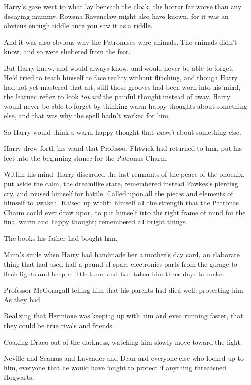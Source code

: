 Harry's gaze went to what lay beneath the cloak, the horror far worse than any
decaying mummy. Rowena Ravenclaw might also have known, for it was an obvious
enough riddle once you saw it as a riddle.

And it was also obvious why the Patronuses were animals. The animals didn't
know, and so were sheltered from the fear.

But Harry knew, and would always know, and would never be able to forget. He'd
tried to teach himself to face reality without flinching, and though Harry had
not yet mastered that art, still those grooves had been worn into his mind, the
learned reflex to look \emph{toward} the painful thought instead of away. Harry
would never be able to forget by thinking warm happy thoughts about something
else, and that was why the spell hadn't worked for him.

So Harry would think a warm happy thought that \emph{wasn't} about something
else.

Harry drew forth his wand that Professor Flitwick had returned to him, put his
feet into the beginning stance for the Patronus Charm.

Within his mind, Harry discarded the last remnants of the peace of the phoenix,
put aside the calm, the dreamlike state, remembered instead Fawkes's piercing
cry, and roused himself for battle. Called upon all the pieces and elements of
himself to awaken. Raised up within himself all the strength that the Patronus
Charm could ever draw upon, to put himself into the right frame of mind for the
final warm and happy thought; remembered all bright things.

The books his father had bought him.

Mum's smile when Harry had handmade her a mother's day card, an elaborate thing
that had used half a pound of spare electronics parts from the garage to flash
lights and beep a little tune, and had taken him three days to make.

Professor McGonagall telling him that his parents had died well, protecting
him. As they had.

Realizing that Hermione was keeping up with him and even running faster, that
they could be true rivals and friends.

Coaxing Draco out of the darkness, watching him slowly move toward the light.

Neville and Seamus and Lavender and Dean and everyone else who looked up to
him, everyone that he would have fought to protect if anything threatened
Hogwarts.

